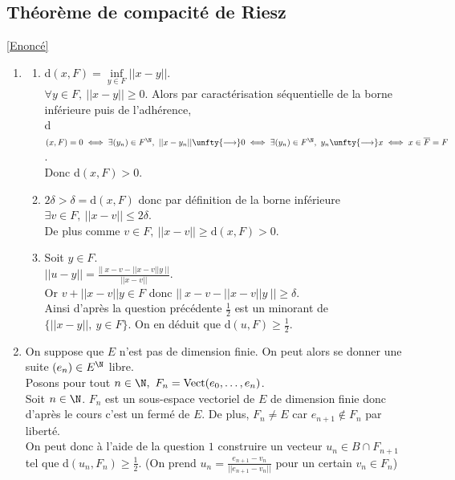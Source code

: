 \documentclass{book}
\begin{document}
	\subsection{Théorème de compacité de Riesz }
	\label{sec:theoreme-de-compacite-de-riesz-etoile4}
	\textcolor{blue}{\hyperref[Théorème de compacité de Riesz]{[Enoncé]}}\\
	\label{Théorème de compacité de Riesz corrigé}
	\begin{enumerate}[leftmargin=*]
		\item \begin{enumerate}[label=\alph*.]
			\item d$(x,F)=\inf\limits_{y\in F}||x-y||$.\\
			$\forall y\in F,\ ||x-y||\geq 0$. Alors par caractérisation séquentielle de la borne inférieure puis de l'adhérence,\\
			d$(x,F)=0\iff \exists (y_n)\in F^\N,\ ||x-y_n||\unfty{\longrightarrow}0\iff \exists (y_n)\in F^\N,\ y_n\unfty{\longrightarrow}x\iff x\in \overline{F}=F$.\\
			Donc d$(x,F)>0$.
			\item $2\delta>\delta=\text{d}(x,F)$ donc par définition de la borne inférieure $\exists v\in F,\ ||x-v||\leq 2\delta$.\\
			De plus comme $v\in F,\ ||x-v||\geq \text{d}(x,F)>0$.
			\item Soit $y\in F$.\\
			$||u-y||=\displaystyle\frac{||\ x-v-||x-v||y\ ||}{||x-v||}$.\\
			Or $v+||x-v||y\in F$ donc $||\ x-v-||x-v||y\ ||\geq \delta$.\\
			Ainsi d'après la question précédente $\displaystyle\frac{1}{2}$ est un minorant de $\{||x-y||,\ y\in F\}$. On en déduit que d$(u,F)\geq \displaystyle\frac{1}{2}$.
		\end{enumerate}
		\item On suppose que $E$ n'est pas de dimension finie. On peut alors se donner une suite $(e_n)\in E^\N$ libre.\\
		Posons pour tout $n\in \N,\ F_n=\text{Vect}(e_0,\dots,e_n)$.\\
		Soit $n\in \N$. $F_n$ est un sous-espace vectoriel de $E$ de dimension finie donc d'après le cours c'est un fermé de $E$. De plus, $F_n\ne E$ car $e_{n+1}\notin F_n$ par liberté.\\
		On peut donc à l'aide de la question $1$ construire un vecteur $u_n\in B\cap F_{n+1}$ tel que d$(u_n,F_n)\geq \displaystyle\frac{1}{2}$. (On prend $u_n=\displaystyle\frac{e_{n+1}-v_n}{||e_{n+1}-v_n||}$ pour un certain $v_n\in F_n$)\\

\end{enumerate}
\end{document}
